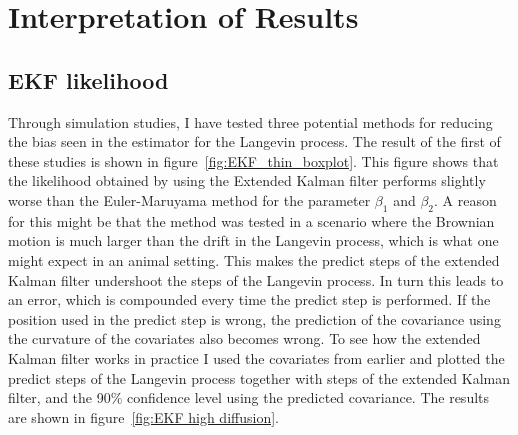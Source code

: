 

\section{Interpretation of Results}
\subsection{EKF likelihood}
Through simulation studies, I have tested three potential methods for reducing the bias seen in the \parencite{michelot_langevin_2019} estimator for the Langevin process. The result of the first of these studies is shown in figure~\ref{fig:EKF_thin_boxplot}. This figure shows that the likelihood obtained by using the Extended Kalman filter performs slightly worse than the Euler-Maruyama method for the parameter $\beta_1$ and $\beta_2$. A reason for this might be that the method was tested in a scenario where the Brownian motion is much larger than the drift in the Langevin process, which is what one might expect in an animal setting. This makes the predict steps of the extended Kalman filter undershoot the steps of the Langevin process. In turn this leads to an error, which is compounded every time the predict step is performed. If the position used in the predict step is wrong, the prediction of the covariance using the curvature of the covariates also becomes wrong. To see how the extended Kalman filter works in practice I used the covariates from earlier and plotted the predict steps of the Langevin process together with steps of the extended Kalman filter, and the 90\% confidence level using the predicted covariance. The results are shown in figure~\ref{fig:EKF high diffusion}. 


